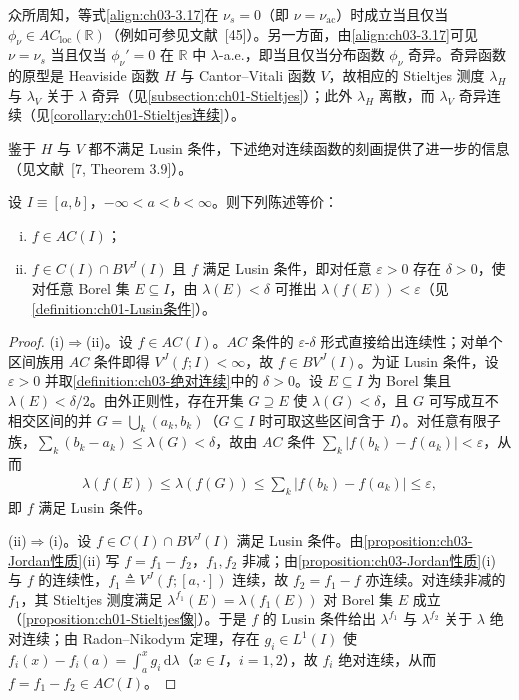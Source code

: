 \documentclass[../../main.tex]{subfiles}%
\begin{document}
众所周知，等式\eqref{align:ch03-3.17}在 $\nu_s=0$（即 $\nu=\nu_{\mathrm{ac}}$）时成立当且仅当 $\phi_\nu\in AC_{\mathrm{loc}}(\mathbb{R})$（例如可参见文献~[45]）。另一方面，由\eqref{align:ch03-3.17}可见 $\nu=\nu_s$ 当且仅当 $\phi_\nu'=0$ 在 $\mathbb{R}$ 中 $\lambda$-a.e.，即当且仅当分布函数 $\phi_\nu$ 奇异。奇异函数的原型是 Heaviside 函数 $H$ 与 Cantor--Vitali 函数 $V$，故相应的 Stieltjes 测度 $\lambda_H$ 与 $\lambda_V$ 关于 $\lambda$ 奇异（见\cref{subsection:ch01-Stieltjes}）；此外 $\lambda_H$ 离散，而 $\lambda_V$ 奇异连续（见\cref{corollary:ch01-Stieltjes连续}）。

鉴于 $H$ 与 $V$ 都不满足 Lusin 条件，下述绝对连续函数的刻画提供了进一步的信息（见文献~[7, Theorem 3.9]）。

\begin{theorem}\label{theorem:ch03-VBZ}
设 $I\equiv[a,b]$，$-\infty<a<b<\infty$。则下列陈述等价：
\begin{enumerate}[(i)]
\item $f\in AC(I)$；
\item $f\in C(I)\cap BV^J(I)$ 且 $f$ 满足 Lusin 条件，即对任意 $\varepsilon>0$ 存在 $\delta>0$，使对任意 Borel 集 $E\subseteq I$，由 $\lambda(E)<\delta$ 可推出 $\lambda(f(E))<\varepsilon$（见\cref{definition:ch01-Lusin条件}）。
\end{enumerate}
\end{theorem}

\begin{proof}
(i)$\Rightarrow$(ii)。设 $f\in AC(I)$。$AC$ 条件的 $\varepsilon$-$\delta$ 形式直接给出连续性；对单个区间族用 $AC$ 条件即得 $V^J(f;I)<\infty$，故 $f\in BV^J(I)$。为证 Lusin 条件，设 $\varepsilon>0$ 并取\cref{definition:ch03-绝对连续}中的 $\delta>0$。设 $E\subseteq I$ 为 Borel 集且 $\lambda(E)<\delta/2$。由外正则性，存在开集 $G\supseteq E$ 使 $\lambda(G)<\delta$，且 $G$ 可写成互不相交区间的并 $G=\bigcup_k(a_k,b_k)$（$G\subseteq I$ 时可取这些区间含于 $I$）。对任意有限子族，$\sum_k(b_k-a_k)\leqslant\lambda(G)<\delta$，故由 $AC$ 条件 $\sum_k|f(b_k)-f(a_k)|<\varepsilon$，从而
\begin{align*}
\lambda(f(E))\leqslant\lambda(f(G))\leqslant\sum_k|f(b_k)-f(a_k)|\leqslant\varepsilon,
\end{align*}
即 $f$ 满足 Lusin 条件。

(ii)$\Rightarrow$(i)。设 $f\in C(I)\cap BV^J(I)$ 满足 Lusin 条件。由\cref{proposition:ch03-Jordan性质}(ii) 写 $f=f_1-f_2$，$f_1,f_2$ 非减；由\cref{proposition:ch03-Jordan性质}(i) 与 $f$ 的连续性，$f_1\triangleq V^J(f;[a,\cdot])$ 连续，故 $f_2=f_1-f$ 亦连续。对连续非减的 $f_1$，其 Stieltjes 测度满足 $\lambda^{f_1}(E)=\lambda(f_1(E))$ 对 Borel 集 $E$ 成立（\cref{proposition:ch01-Stieltjes像}）。于是 $f$ 的 Lusin 条件给出 $\lambda^{f_1}$ 与 $\lambda^{f_2}$ 关于 $\lambda$ 绝对连续；由 Radon--Nikodym 定理，存在 $g_i\in L^1(I)$ 使 $f_i(x)-f_i(a)=\int_a^xg_i\,\mathrm{d}\lambda$（$x\in I$，$i=1,2$），故 $f_i$ 绝对连续，从而 $f=f_1-f_2\in AC(I)$。
\end{proof}
\end{document}
